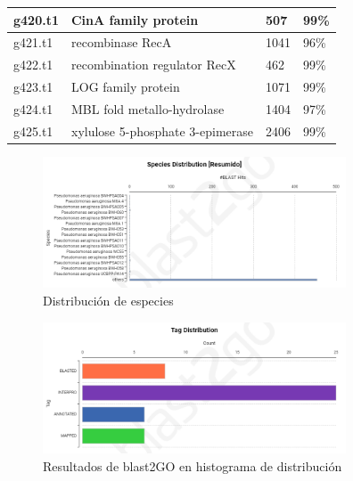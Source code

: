 \documentclass[journal, letterpaper, 11pt]{IEEEtran}
\begin{document}
\begin{table}[H]
\begin{center}
\begin{tabular}{|p{1cm}|p{3.5cm}||p{1cm}||p{1cm}|}
g420.t1 & CinA family protein & 507 & 99\% \\ \hline
g421.t1 & recombinase RecA  & 1041 & 96\% \\ \hline
g422.t1 & recombination regulator RecX & 462 & 99\% \\ \hline
g423.t1 & LOG family protein & 1071 & 99\% \\ \hline
g424.t1 & MBL fold metallo-hydrolase & 1404 & 97\% \\ \hline
g425.t1 & xylulose 5-phosphate 3-epimerase & 2406 & 99\% \\ \hline
\end{tabular}
\end{center}
\end{table}


\begin{figure}[H]
\centering
\includegraphics[width=9cm]{imagenes/species_distribution.png}
\caption{Distribución de especies}
\end{figure}

\begin{figure}[H]
\centering
\includegraphics[width=9cm]{imagenes/tag_distribution.png}
\caption{Resultados de blast2GO en histograma de distribución}
\end{figure}
\end{document}
